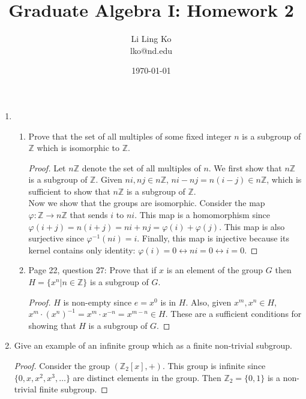 \documentclass{article}
\begin{document}
\title{Graduate Algebra I: Homework 2}
\author{Li Ling Ko\\ lko@nd.edu}
\date{\today}
\maketitle

\begin{enumerate}
  \item
    \begin{enumerate}
      \item Prove that the set of all multiples of some fixed integer $n$
        is a subgroup of $\mathbb{Z}$ which is isomorphic to $\mathbb{Z}$.
        \begin{proof}
          Let $n\mathbb{Z}$ denote the set of all multiples of $n$. We
          first show that $n\mathbb{Z}$ is a subgroup of $\mathbb{Z}$.
          Given $ni,nj\in n\mathbb{Z}$, $ni-nj=n(i-j)\in n\mathbb{Z}$,
          which is sufficient to show that $n\mathbb{Z}$ is a subgroup of
          $\mathbb{Z}$. \\
          
          Now we show that the groups are isomorphic. Consider the map
          $\varphi:\mathbb{Z}\rightarrow n\mathbb{Z}$ that sends $i$ to
          $ni$. This map is a homomorphism since
          $\varphi(i+j)=n(i+j)=ni+nj=\varphi(i)+\varphi(j)$. This map is
          also surjective since $\varphi^{-1}(ni)=i$. Finally, this map is
          injective because its kernel contains only identity:
          $\varphi(i)=0\leftrightarrow ni=0\leftrightarrow i=0$.
        \end{proof}
      \item Page 22, question 27: Prove that if $x$ is an element of the
        group $G$ then $H=\{x^n|n\in\mathbb{Z}\}$ is a subgroup of $G$.

        \begin{proof}
          $H$ is non-empty since $e=x^0$ is in $H$. Also, given $x^m,x^n\in
          H$, $x^m\cdot(x^n)^{-1}=x^m\cdot x^{-n}=x^{m-n}\in H$. These are
          a sufficient conditions for showing that $H$ is a subgroup of
          $G$.
        \end{proof}
    \end{enumerate}

  \item Give an example of an infinite group which as a finite non-trivial
    subgroup.

    \begin{proof}
      Consider the group $(\mathbb{Z}_2[x],+)$. This group is infinite
      since $\{0,x,x^2,x^3,\ldots\}$ are distinct elements in the group.
      Then $\mathbb{Z}_2=\{0,1\}$ is a non-trivial finite subgroup.
    \end{proof}


\end{enumerate}
\end{document}
